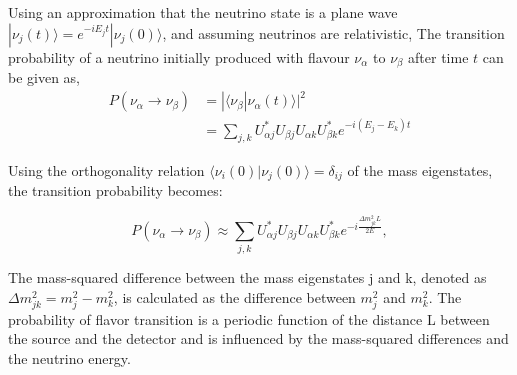 Using an approximation that the neutrino state is a plane wave $|\nu_j(t)\rangle = e^{-iE_j t} |\nu_j(0)\rangle$, and assuming neutrinos are relativistic, The transition probability of a neutrino initially produced with flavour $\nu_{\alpha}$ to $\nu_{\beta}$ after time $t$ can be given as,
\begin{equation}\label{eq:oscillation}
        \begin{split}
                P(\nu_\alpha \rightarrow \nu_\beta) &= |\langle \nu_\beta | \nu_\alpha(t) \rangle|^2 \\
                &=  \sum_{j,k} U_{\alpha j}^* U_{\beta j} U_{\alpha k} U_{\beta k}^* e^{-i(E_{j}-E_{k})t} 
        \end{split}
\end{equation}
            

Using the orthogonality relation $\langle \nu_i(0) | \nu_j(0) \rangle = \delta_{ij}$ of the mass eigenstates, the transition probability becomes:

\begin{equation}\label{eq:main_probability}
P(\nu_\alpha \rightarrow \nu_\beta) \approx \sum_{j,k} U_{\alpha j}^* U_{\beta j} U_{\alpha k} U_{\beta k}^* e^{-i \frac{\Delta m_{jk}^2 L}{2E}},
\end{equation}

The mass-squared difference between the mass eigenstates j and k, denoted as $\Delta m_{jk}^2 = m_j^2 - m_k^2$, is calculated as the difference between $m_j^2$ and $m_k^2$. The probability of flavor transition is a periodic function of the distance L between the source and the detector and is influenced by the mass-squared differences and the neutrino energy. 

